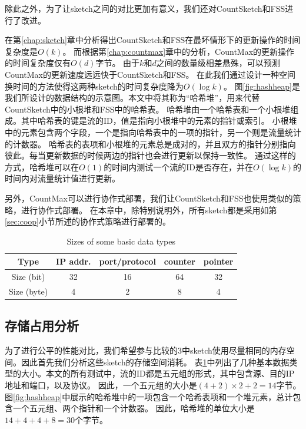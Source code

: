 除此之外，为了让sketch之间的对比更加有意义，我们还对CountSketch和FSS进行了改进。

在第\ref{chap:sketch}章中分析得出CountSketch和FSS在最坏情形下的更新操作的时间复杂度是$O(k)$。
而根据第\ref{chap:countmax}章中的分析，CountMax的更新操作的时间复杂度仅有$O(d)$字节。
由于$k$和$d$之间的数量级相差悬殊，可以预测CountMax的更新速度远远快于CountSketch和FSS。
在此我们通过设计一种空间换时间的方法使得这两种sketch的时间复杂度降为$O(\log{k})$。
图\ref{fig:hashheap}是我们所设计的数据结构的示意图。本文中将其称为“哈希堆”，用来代替CountSketch中的小根堆和FSS中的哈希表。
哈希堆由一个哈希表和一个小根堆组成。其中哈希表的键是流的ID，值是指向小根堆中的元素的指针或索引。
小根堆中的元素包含两个字段，一个是指向哈希表中的一项的指针，另一个则是流量统计的计数器。
哈希表的表项和小根堆的元素总是成对的，并且双方的指针分别指向彼此。每当更新数据的时候两边的指针也会进行更新以保持一致性。
通过这样的方式，哈希堆可以在$O(1)$的时间内测试一个流的ID是否存在，并在$O(\log{k})$的时间内对流量统计值进行更新。

另外，CountMax可以进行协作式部署，我们让CountSketch和FSS也使用类似的策略，进行协作式部署。
在本章中，除特别说明外，所有sketch都是采用如第\ref{sec:coop}小节所述的协作式策略进行部署的。

\begin{table}[h]
	\centering
	\begin{tabular}{c|c|c|c|c}
		\hline
		Type & IP addr. & port/protocol & counter &pointer\\
		\hline
		Size (bit) & 32 & 16 & 64 & 32\\
		\hline
		Size (byte) & 4 & 2 & 8 & 4\\
		\hline
	\end{tabular}
    \caption{\textnormal{Sizes of some basic data types}}
    \label{tbl:datasize}
\end{table}


\subsection{存储占用分析}\label{subsec:memory}

为了进行公平的性能对比，我们希望参与比较的3中sketch使用尽量相同的内存空间。因此首先我们分析这些sketch的存储空间消耗。
表\ref{tbl:datasize}中列出了几种基本数据类型的大小。本文的所有测试中，流的ID都是五元组的形式，其中包含源、目的IP地址和端口，以及协议。
因此，一个五元组的大小是$ (4 + 2 ) \times 2 + 2=14$字节。
图\ref{fig:hashheap}中展示的哈希堆中的一项包含一个哈希表项和一个堆元素，总计包含一个五元组、两个指针和一个计数器。
因此，哈希堆的单位大小是$14+4+4+8=30$个字节。

